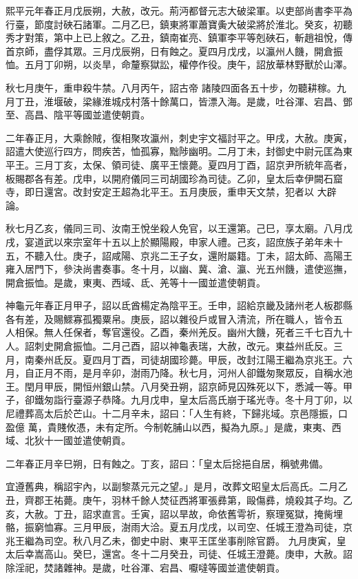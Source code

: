 \begin{pinyinscope}
 熙平元年春正月戊辰朔，大赦，改元。荊沔都督元志大破梁軍。以吏部尚書李平為行臺，節度討硤石諸軍。二月乙巳，鎮東將軍蕭寶夤大破梁將於淮北。癸亥，初聽秀才對策，第中上已上敘之。乙丑，鎮南崔亮、鎮軍李平等剋硤石，斬趙祖悅，傳首京師，盡俘其眾。三月戊辰朔，日有蝕之。夏四月戊戌，以瀛州人饑，開倉振恤。五月丁卯朔，以炎旱，命釐察獄訟，權停作役。庚午，詔放華林野獸於山澤。



 秋七月庚午，重申殺牛禁。八月丙午，詔古帝
 諸陵四面各五十步，勿聽耕稼。九月丁丑，淮堰破，梁緣淮城戍村落十餘萬口，皆漂入海。是歲，吐谷渾、宕昌、鄧至、高昌、陰平等國並遣使朝貢。



 二年春正月，大乘餘賊，復相聚攻瀛州，刺史宇文福討平之。甲戌，大赦。庚寅，詔遣大使巡行四方，問疾苦，恤孤寡，黜陟幽明。二月丁未，封御史中尉元匡為東平王。三月丁亥，太保、領司徒、廣平王懷薨。夏四月丁酉，詔京尹所統年高者，板賜郡各有差。戊申，以開府儀同三司胡國珍為司徒。乙卯，皇太后幸伊闕石窟寺，即日還宮。改封安定王超為北平王。五月庚辰，重申天文禁，犯者以
 大辟論。



 秋七月乙亥，儀同三司、汝南王悅坐殺人免官，以王還第。己巳，享太廟。八月戊戌，宴道武以來宗室年十五以上於顯陽殿，申家人禮。己亥，詔庶族子弟年未十五，不聽入仕。庚子，詔咸陽、京兆二王子女，還附屬籍。丁未，詔太師、高陽王雍入居門下，參決尚書奏事。冬十月，以幽、冀、滄、瀛、光五州饑，遣使巡撫，開倉振恤。是歲，東夷、西域、氐、羌等十一國並遣使朝貢。



 神龜元年春正月甲子，詔以氐酋楊定為陰平王。壬申，詔給京畿及諸州老人板郡縣各有差，及賜鰥寡孤獨粟帛。庚辰，詔以雜役戶或冒入清流，所在職人，皆令五
 人相保。無人任保者，奪官還役。乙酉，秦州羌反。幽州大饑，死者三千七百九十人。詔刺史開倉振恤。二月己酉，詔以神龜表瑞，大赦，改元。東益州氐反。三月，南秦州氐反。夏四月丁酉，司徒胡國珍薨。甲辰，改封江陽王繼為京兆王。六月，自正月不雨，是月辛卯，澍雨乃降。秋七月，河州人卻鐵匆聚眾反，自稱水池王。閏月甲辰，開恒州銀山禁。八月癸丑朔，詔京師見囚殊死以下，悉減一等。甲子，卻鐵匆詣行臺源子恭降。九月戊申，皇太后高氏崩于瑤光寺。冬十月丁卯，以尼禮葬高太后於芒山。十二月辛未，詔曰：「人生有終，下歸兆域。京邑隱振，口盈億
 萬，貴賤攸憑，未有定所。今制乾脯山以西，擬為九原。」是歲，東夷、西域、北狄十一國並遣使朝貢。



 二年春正月辛巳朔，日有蝕之。丁亥，詔曰：「皇太后捴挹自居，稱號弗備。



 宜遵舊典，稱詔宇內，以副黎蒸元元之望。」是月，改葬文昭皇太后高氏。二月乙丑，齊郡王祐薨。庚午，羽林千餘人焚征西將軍張彞第，毆傷彞，燒殺其子均。乙亥，大赦。丁丑，詔求直言。壬寅，詔以旱故，命依舊雩祈，察理冤獄，掩胔埋骼，振窮恤寡。三月甲辰，澍雨大洽。夏五月戊戌，以司空、任城王澄為司徒，京兆王繼為司空。秋八月乙未，御史中尉、東平王匡坐事削除官爵。
 九月庚寅，皇太后幸嵩高山。癸巳，還宮。冬十二月癸丑，司徒、任城王澄薨。庚申，大赦。詔除淫祀，焚諸雜神。是歲，吐谷渾、宕昌、嚈噠等國並遣使朝貢。




\end{pinyinscope}
